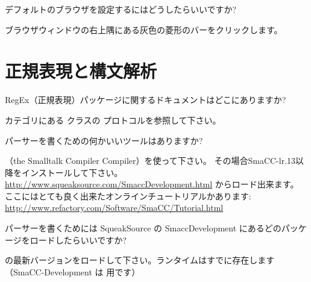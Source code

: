 \documentclass[a4paper,10pt,twoside]{book}
\begin{document}
\begin{faq}
デフォルトのブラウザを設定するにはどうしたらいいですか?
\end{faq}
\answer
ブラウザウィンドウの右上隅にある灰色の菱形のバーをクリックします。

\section{正規表現と構文解析}


\begin{faq}
RegEx（正規表現）パッケージに関するドキュメントはどこにありますか?
\end{faq}
\answer
{} カテゴリにある  クラスの  プロトコルを参照して下さい。

\begin{faq}
パーサーを書くための何かいいツールはありますか?
\end{faq}
\answer
{}（the Smalltalk Compiler Compiler）を使って下さい。
その場合SmaCC-lr.13以降をインストールして下さい。
\url{http://www.squeaksource.com/SmaccDevelopment.html} からロード出来ます。
ここにはとても良く出来たオンラインチュートリアルかあります:
\url{http://www.refactory.com/Software/SmaCC/Tutorial.html}

\begin{faq}
パーサーを書くためには SqueakSource の SmaccDevelopment にあるどのパッケージをロードしたらいいですか?
\end{faq}
\answer
{} の最新バージョンをロードして下さい。ランタイムはすでに存在します
（SmaCC-Development は  用です）

\ifx\wholebook\relax\else
\end{document}
